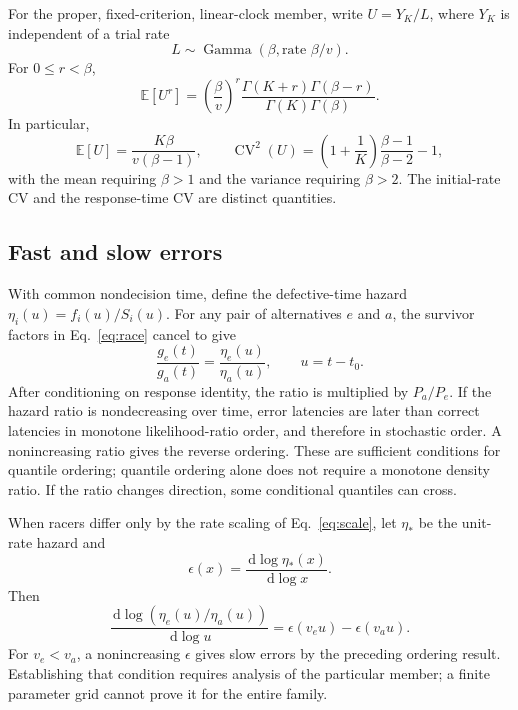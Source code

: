\documentclass[12pt]{article}
\newcommand{\dd}{\,\mathrm{d}}
\newcommand{\GammaDist}{\operatorname{Gamma}}
\newcommand{\E}{\mathbb{E}}
\theoremstyle{definition}
\theoremstyle{plain}
\theoremstyle{remark}
\begin{document}
For the proper, fixed-criterion, linear-clock member, write $U=Y_K/L$, where $Y_K$ is independent of a trial rate
\begin{equation}
 L\sim\GammaDist(\beta,\text{rate }\beta/v).
\end{equation}
For $0\leq r<\beta$,
\begin{equation}
 \E[U^r]=\left(\frac\beta v\right)^r
 \frac{\Gamma(K+r)\Gamma(\beta-r)}{\Gamma(K)\Gamma(\beta)}.\label{eq:moments}
\end{equation}
In particular,
\begin{equation}
 \E[U]=\frac{K\beta}{v(\beta-1)},\qquad
 \operatorname{CV}^2(U)=\left(1+\frac1K\right)
 \frac{\beta-1}{\beta-2}-1,\label{eq:cv-time}
\end{equation}
with the mean requiring $\beta>1$ and the variance requiring $\beta>2$. The initial-rate CV and the response-time CV are distinct quantities.

\subsection{Fast and slow errors}\label{sec:errors}
With common nondecision time, define the defective-time hazard $\eta_i(u)=f_i(u)/S_i(u)$. For any pair of alternatives $e$ and $a$, the survivor factors in Eq.~\eqref{eq:race} cancel to give
\begin{equation}
 \frac{g_e(t)}{g_a(t)}=\frac{\eta_e(u)}{\eta_a(u)},\qquad u=t-t_0.\label{eq:hazard-ratio}
\end{equation}
After conditioning on response identity, the ratio is multiplied by $P_a/P_e$. If the hazard ratio is nondecreasing over time, error latencies are later than correct latencies in monotone likelihood-ratio order, and therefore in stochastic order. A nonincreasing ratio gives the reverse ordering. These are sufficient conditions for quantile ordering; quantile ordering alone does not require a monotone density ratio. If the ratio changes direction, some conditional quantiles can cross.

When racers differ only by the rate scaling of Eq.~\eqref{eq:scale}, let $\eta_*$ be the unit-rate hazard and
\begin{equation}
 \epsilon(x)=\frac{\dd\log\eta_*(x)}{\dd\log x}.
\end{equation}
Then
\begin{equation}
 \frac{\dd\log(\eta_e(u)/\eta_a(u))}{\dd\log u}
 =\epsilon(v_eu)-\epsilon(v_au).\label{eq:elasticity}
\end{equation}
For $v_e<v_a$, a nonincreasing $\epsilon$ gives slow errors by the preceding ordering result. Establishing that condition requires analysis of the particular member; a finite parameter grid cannot prove it for the entire family.
\end{document}
